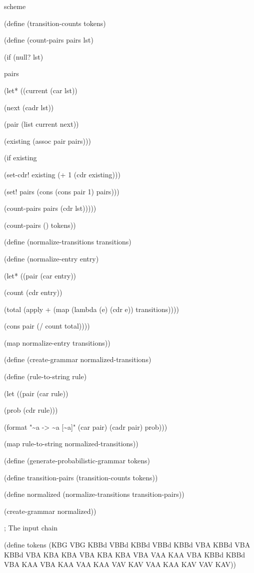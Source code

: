 \documentclass[
]{article}
\begin{document}
scheme

(define (transition-counts tokens)

(define (count-pairs pairs lst)

(if (null? lst)

pairs

(let* ((current (car lst))

(next (cadr lst))

(pair (list current next))

(existing (assoc pair pairs)))

(if existing

(set-cdr! existing (+ 1 (cdr existing)))

(set! pairs (cons (cons pair 1) pairs)))

(count-pairs pairs (cdr lst)))))

(count-pairs \textquotesingle() tokens))

(define (normalize-transitions transitions)

(define (normalize-entry entry)

(let* ((pair (car entry))

(count (cdr entry))

(total (apply + (map (lambda (e) (cdr e)) transitions))))

(cons pair (/ count total))))

(map normalize-entry transitions))

(define (create-grammar normalized-transitions)

(define (rule-to-string rule)

(let ((pair (car rule))

(prob (cdr rule)))

(format "\textasciitilde a -\textgreater{} \textasciitilde a
{[}\textasciitilde a{]}" (car pair) (cadr pair) prob)))

(map rule-to-string normalized-transitions))

(define (generate-probabilistic-grammar tokens)

(define transition-pairs (transition-counts tokens))

(define normalized (normalize-transitions transition-pairs))

(create-grammar normalized))

; The input chain

(define tokens \textquotesingle(KBG VBG KBBd VBBd KBBd VBBd KBBd VBA
KBBd VBA KBBd VBA KBA KBA VBA KBA KBA VBA VAA KAA VBA KBBd KBBd VBA KAA
VBA KAA VAA KAA VAV KAV VAA KAA KAV VAV KAV))
\end{document}
